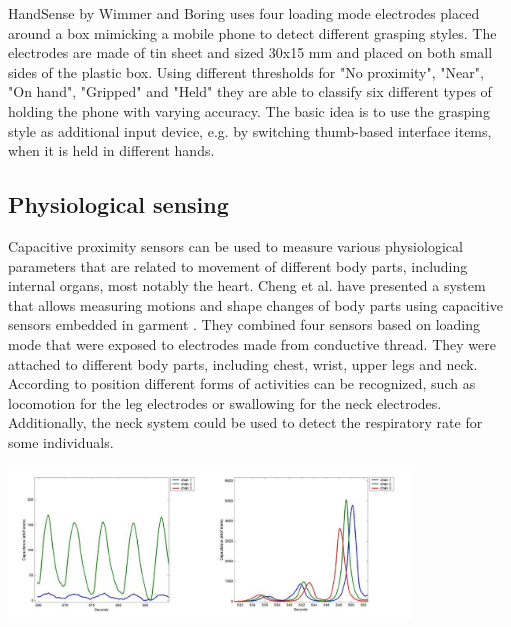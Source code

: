 HandSense by Wimmer and Boring uses four loading mode electrodes placed around a box mimicking a mobile phone to detect different grasping styles. The electrodes are made of tin sheet and sized 30x15 mm and placed on both small sides of the plastic box. Using different thresholds for "No proximity", "Near", "On hand", "Gripped" and "Held" they are able to classify six different types of holding the phone with varying accuracy. The basic idea is to use the grasping style as additional input device, e.g. by switching thumb-based interface items, when it is held in different hands.

\subsection{Physiological sensing}
Capacitive proximity sensors can be used to measure various physiological parameters that are related to movement of different body parts, including internal organs, most notably the heart. Cheng et al. have presented a system that allows measuring motions and shape changes of body parts using capacitive sensors embedded in garment \cite{cheng2010active}. They combined four sensors based on loading mode that were exposed to electrodes made from conductive thread. They were attached to different body parts, including chest, wrist, upper legs and neck. According to position different forms of activities can be recognized, such as locomotion for the leg electrodes or swallowing for the neck electrodes. Additionally, the neck system could be used to detect the respiratory rate for some individuals. 

\begin{minipage}{\linewidth}
\centering
\includegraphics[width=0.8\textwidth]{images/spread_breath}
\label{fig:spread_breath}
\end{minipage}

